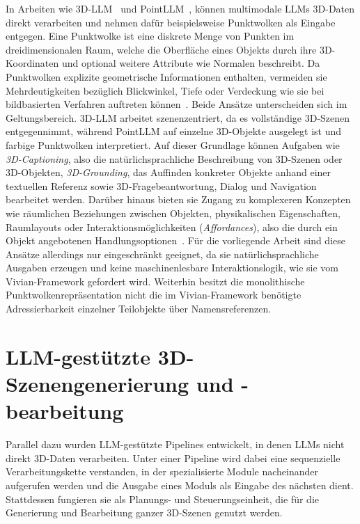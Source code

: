In Arbeiten wie 3D-LLM~\cite{hong3DLLMInjecting3D2023} und PointLLM~\cite{xuPointLLMEmpoweringLarge2025}, können multimodale LLMs 3D-Daten direkt verarbeiten und nehmen dafür beispielsweise Punktwolken als Eingabe entgegen.
Eine Punktwolke ist eine diskrete Menge von Punkten im dreidimensionalen Raum, welche die Oberfläche eines Objekts durch ihre 3D-Koordinaten und optional weitere Attribute wie Normalen beschreibt.
Da Punktwolken explizite geometrische Informationen enthalten, vermeiden sie Mehrdeutigkeiten bezüglich Blickwinkel, Tiefe oder Verdeckung wie sie bei bildbasierten Verfahren auftreten können~\cite{xuPointLLMEmpoweringLarge2025}.
Beide Ansätze unterscheiden sich im Geltungsbereich. 3D-LLM arbeitet szenenzentriert, da es vollständige 3D-Szenen entgegennimmt, während PointLLM auf einzelne 3D-Objekte ausgelegt ist und farbige Punktwolken interpretiert.
Auf dieser Grundlage können Aufgaben wie \textit{3D-Captioning}, also die natürlichsprachliche Beschreibung von 3D-Szenen oder 3D-Objekten, \textit{3D-Grounding}, das Auffinden konkreter Objekte anhand einer textuellen Referenz sowie 3D-Fragebeantwortung, Dialog und Navigation bearbeitet werden.
Darüber hinaus bieten sie Zugang zu komplexeren Konzepten wie räumlichen Beziehungen zwischen Objekten, physikalischen Eigenschaften, Raumlayouts oder Interaktionsmöglichkeiten (\textit{Affordances}), also die durch ein Objekt angebotenen Handlungsoptionen~\cite{hong3DLLMInjecting3D2023,xuPointLLMEmpoweringLarge2025}.
Für die vorliegende Arbeit sind diese Ansätze allerdings nur eingeschränkt geeignet, da sie natürlichsprachliche Ausgaben erzeugen und keine maschinenlesbare Interaktionslogik, wie sie vom Vivian-Framework gefordert wird.
Weiterhin besitzt die monolithische Punktwolkenrepräsentation nicht die im Vivian-Framework benötigte Adressierbarkeit einzelner Teilobjekte über Namensreferenzen.

\section{LLM-gestützte 3D-Szenengenerierung und -bearbeitung}

Parallel dazu wurden LLM-gestützte Pipelines entwickelt, in denen LLMs nicht direkt 3D-Daten verarbeiten. Unter einer Pipeline wird dabei eine sequenzielle Verarbeitungskette verstanden, in der spezialisierte Module nacheinander aufgerufen werden und die Ausgabe eines Moduls als Eingabe des nächsten dient.
Stattdessen fungieren sie als Planungs- und Steuerungseinheit, die für die Generierung und Bearbeitung ganzer 3D-Szenen genutzt werden.

